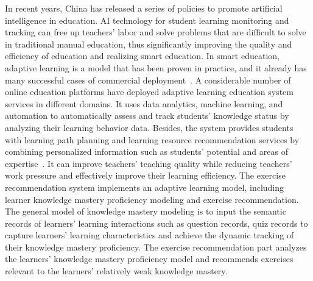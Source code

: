 
In recent years, China has released a series of policies to promote artificial intelligence in education. AI technology for student learning monitoring and tracking can free up teachers' labor and solve problems that are difficult to solve in traditional manual education, thus significantly improving the quality and efficiency of education and realizing smart education. In smart education, adaptive learning is a model that has been proven in practice, and it already has many successful cases of commercial deployment~\cite{chen2018recommendation}. A considerable number of online education platforms have deployed adaptive learning education system services in different domains. It uses data analytics, machine learning, and automation to automatically assess and track students' knowledge status by analyzing their learning behavior data. Besides, the system provides students with learning path planning and learning resource recommendation services by combining personalized information such as students' potential and areas of expertise~\cite{soltani2019adaptive}. It can improve teachers' teaching quality while reducing teachers' work pressure and effectively improve their learning efficiency. The exercise recommendation system implements an adaptive learning model, including learner knowledge mastery proficiency modeling and exercise recommendation. The general model of knowledge mastery modeling is to input the semantic records of learners' learning interactions such as question records, quiz records to capture learners' learning characteristics and achieve the dynamic tracking of their knowledge mastery proficiency. The exercise recommendation part analyzes the learners' knowledge mastery proficiency model and recommends exercises relevant to the learners' relatively weak knowledge mastery.

